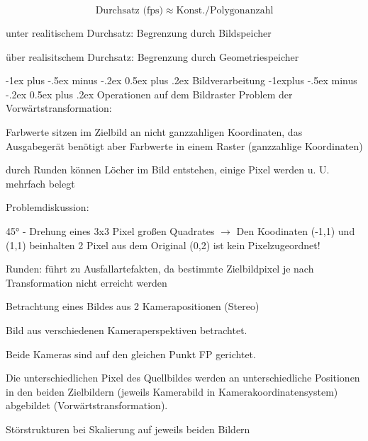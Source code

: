 \documentclass[landscape]{article}
\makeatletter
\renewcommand{\section}{\@startsection{section}{1}{0mm}%
                                {-1ex plus -.5ex minus -.2ex}%
                                {0.5ex plus .2ex}%
                                {\normalfont\large\bfseries}}
\renewcommand{\subsection}{\@startsection{subsection}{2}{0mm}%
                                {-1explus -.5ex minus -.2ex}%
                                {0.5ex plus .2ex}%
                                {\normalfont\normalsize\bfseries}}
\makeatother
\begin{document}
\begin{multicols}{3}
  $$\text{Durchsatz (fps)} \approx \text{Konst.} / \text{Polygonanzahl}$$
  \begin{itemize*}
    \item unter realitischem Durchsatz: Begrenzung durch Bildspeicher
    \item über realisitschem Durchsatz: Begrenzung durch Geometriespeicher
  \end{itemize*}
  
  
\end{multicols}
\newpage
\begin{multicols}{3}
  \section{Bildverarbeitung}
  \subsection{Operationen auf dem Bildraster}
  Problem der Vorwärtstransformation:
  \begin{itemize*}
    \item Farbwerte sitzen im Zielbild an nicht ganzzahligen Koordinaten, das Ausgabegerät benötigt aber Farbwerte in einem Raster (ganzzahlige Koordinaten)
    \item durch Runden können Löcher im Bild entstehen, einige Pixel werden u. U. mehrfach belegt
  \end{itemize*}
  
  
  Problemdiskussion: 
  \begin{itemize*}
    \item 45° - Drehung eines 3x3 Pixel großen Quadrates $\rightarrow$ Den Koodinaten (-1,1) und (1,1) beinhalten 2 Pixel aus dem Original (0,2) ist kein Pixelzugeordnet!
    \item Runden: führt zu Ausfallartefakten, da bestimmte Zielbildpixel je nach Transformation nicht erreicht werden
    \item Betrachtung eines Bildes aus 2 Kamerapositionen (Stereo)
    \begin{itemize*}
      \item Bild aus verschiedenen Kameraperspektiven betrachtet.
      \item Beide Kameras sind auf den gleichen Punkt FP gerichtet.
      \item Die unterschiedlichen Pixel des Quellbildes werden an unterschiedliche Positionen in den beiden Zielbildern (jeweils Kamerabild in Kamerakoordinatensystem) abgebildet (Vorwärtstransformation).
      \item Störstrukturen bei Skalierung auf jeweils beiden Bildern
    \end{itemize*}
  \end{itemize*}
  

\end{multicols}
\end{document}
